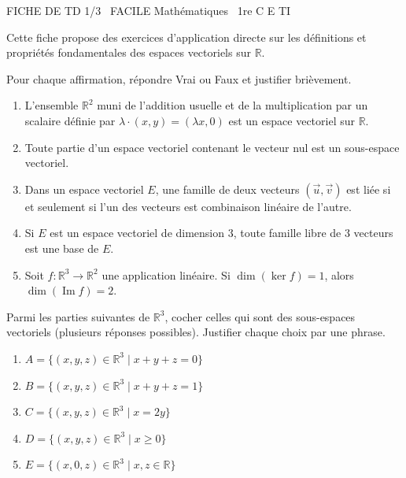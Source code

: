 \documentclass[11pt]{article}
\begin{document}
\begin{tcolorbox}[enhanced,colback=popink,colframe=popink,arc=10pt,boxrule=0pt,left=12pt,right=12pt,top=9pt,bottom=9pt]
{\color{white}\popxbold\small FICHE DE TD 1/3 \textbullet\ FACILE \hfill Mathématiques \textbullet\ 1re C E TI\par}
\end{tcolorbox}
\vspace{4pt}
Cette fiche propose des exercices d'application directe sur les définitions et propriétés fondamentales des espaces vectoriels sur $\mathbb{R}$.

\begin{exercice}
Pour chaque affirmation, répondre Vrai ou Faux et justifier brièvement.
\begin{enumerate}
    \item L'ensemble $\mathbb{R}^2$ muni de l'addition usuelle et de la multiplication par un scalaire définie par $\lambda \cdot (x,y) = (\lambda x, 0)$ est un espace vectoriel sur $\mathbb{R}$.
    \item Toute partie d'un espace vectoriel contenant le vecteur nul est un sous-espace vectoriel.
    \item Dans un espace vectoriel $E$, une famille de deux vecteurs $( \vec{u}, \vec{v} )$ est liée si et seulement si l'un des vecteurs est combinaison linéaire de l'autre.
    \item Si $E$ est un espace vectoriel de dimension $3$, toute famille libre de $3$ vecteurs est une base de $E$.
    \item Soit $f : \mathbb{R}^3 \to \mathbb{R}^2$ une application linéaire. Si $\dim(\ker f) = 1$, alors $\dim(\operatorname{Im} f) = 2$.
\end{enumerate}
\end{exercice}

\begin{exercice}
Parmi les parties suivantes de $\mathbb{R}^3$, cocher celles qui sont des sous-espaces vectoriels (plusieurs réponses possibles). Justifier chaque choix par une phrase.
\begin{enumerate}
    \item $A = \{ (x,y,z) \in \mathbb{R}^3 \mid x + y + z = 0 \}$
    \item $B = \{ (x,y,z) \in \mathbb{R}^3 \mid x + y + z = 1 \}$
    \item $C = \{ (x,y,z) \in \mathbb{R}^3 \mid x = 2y \}$
    \item $D = \{ (x,y,z) \in \mathbb{R}^3 \mid x \geq 0 \}$
    \item $E = \{ (x,0,z) \in \mathbb{R}^3 \mid x,z \in \mathbb{R} \}$
\end{enumerate}
\end{exercice}
\end{document}
